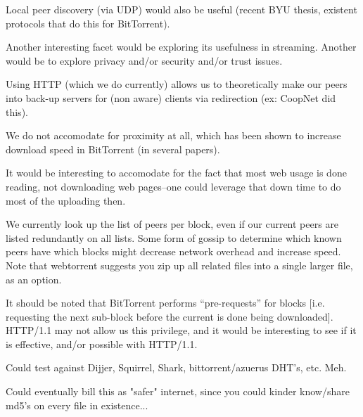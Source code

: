 Local peer discovery (via UDP) would also be useful (recent BYU thesis, existent protocols that do this for BitTorrent).

Another interesting facet would be exploring its usefulness in streaming.  Another would be to explore privacy and/or security and/or trust issues.

Using HTTP (which we do currently) allows us to theoretically make our peers into back-up servers for (non aware) clients via redirection (ex: CoopNet did this).

We do not accomodate for proximity at all, which has been shown to increase download speed in BitTorrent (in several papers).

It would be interesting to accomodate for the fact that most web usage is done reading, not downloading web pages--one could leverage that down time to do most of the uploading then.

We currently look up the list of peers per block, even if our current peers are listed redundantly on all lists.  Some form of gossip to determine which known peers have which blocks might decrease network overhead and increase speed.  Note that webtorrent suggests you zip up all related files into a single larger file, as an option.

It should be noted that BitTorrent performs ``pre-requests'' for blocks [i.e. requesting the next sub-block before the current is done being downloaded].   HTTP/1.1 may not allow us this privilege, and it would be interesting to see if it is effective, and/or possible with HTTP/1.1.

Could test against Dijjer, Squirrel, Shark,  bittorrent/azuerus DHT's, etc. Meh.

Could eventually bill this as "safer" internet, since you could kinder know/share md5's on every file in existence...
